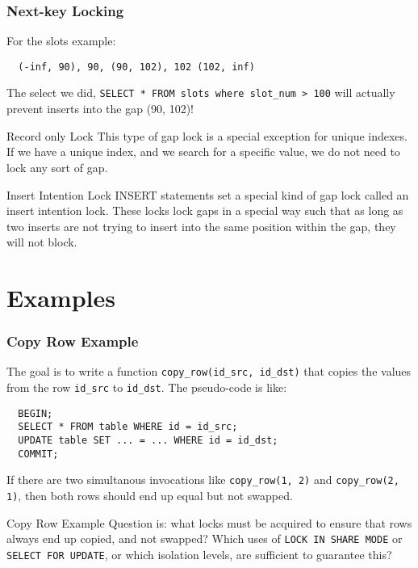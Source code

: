 \documentclass[14pt]{beamer}
\begin{document}
\begin{frame}[fragile]
  \frametitle{Next-key Locking}
  For the slots example:
  \begin{verbatim}
  (-inf, 90), 90, (90, 102), 102 (102, inf)
  \end{verbatim}
  The select we did, \texttt{SELECT * FROM slots where slot\_num > 100} will
  actually prevent inserts into the gap (90, 102)!
\end{frame}

\begin{frame}{Record only Lock}
  This type of gap lock is a special exception for unique indexes. If we have a
  unique index, and we search for a specific value, we do not need to lock any
  sort of gap.
\end{frame}

\begin{frame}{Insert Intention Lock}
  INSERT statements set a special kind of gap lock called an insert intention
  lock. These locks lock gaps in a special way such that as long as two inserts
  are not trying to insert into the same position within the gap, they will not
  block.
\end{frame}

\section{Examples}
\begin{frame}[fragile]
  \frametitle{Copy Row Example}
  The goal is to write a function \texttt{copy\_row(id\_src, id\_dst)} that
  copies the values from the row \texttt{id\_src} to \texttt{id\_dst}. The
  pseudo-code is like:
\begin{verbatim}
  BEGIN;
  SELECT * FROM table WHERE id = id_src;
  UPDATE table SET ... = ... WHERE id = id_dst;
  COMMIT;
\end{verbatim}
  If there are two simultanous invocations like \texttt{copy\_row(1, 2)} and
  \texttt{copy\_row(2, 1)}, then both rows should end up equal but not swapped.
\end{frame}

\begin{frame}{Copy Row Example}
  Question is: what locks must be acquired to ensure that rows always end up
  copied, and not swapped?
  \newline
  \newline
  Which uses of \texttt{LOCK IN SHARE MODE} or
  \texttt{SELECT FOR UPDATE}, or which isolation levels, are sufficient to
  guarantee this?
\end{frame}
\end{document}
